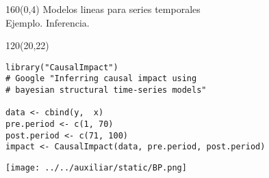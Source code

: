 \documentclass[shownotes,aspectratio=169]{beamer}
\begin{document}
\begin{frame}
\begin{textblock}{160}(0,4)
\centering \LARGE Modelos lineas para series temporales \\
\large Ejemplo. Inferencia.
\end{textblock}

\begin{textblock}{120}(20,22)
\begin{lstlisting}[backgroundcolor=\color{black!10}]
library("CausalImpact")
# Google "Inferring causal impact using
# bayesian structural time-series models"

data <- cbind(y,  x)
pre.period <- c(1, 70)
post.period <- c(71, 100)
impact <- CausalImpact(data, pre.period, post.period)
\end{lstlisting}
\end{textblock}


\end{frame}



\begin{frame}
\centering \vspace{0.5cm}
\texttt{[image: ../../auxiliar/static/BP.png]}
\end{frame}





%
%
\end{document}
